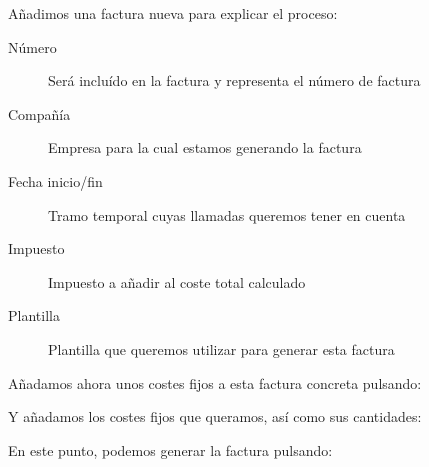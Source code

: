 \documentclass[letterpaper,10pt,spanish]{sphinxmanual}
\begin{document}
Añadimos una factura nueva para explicar el proceso:

\begin{description}
\item[{Número}] \leavevmode{}\label{billing_and_invoices/invoices:term-number}
Será incluído en la factura y representa el número de factura

\item[{Compañía}] \leavevmode{}\label{billing_and_invoices/invoices:term-company}
Empresa para la cual estamos generando la factura

\item[{Fecha inicio/fin}] \leavevmode{}\label{billing_and_invoices/invoices:term-start-end-date}
Tramo temporal cuyas llamadas queremos tener en cuenta

\item[{Impuesto}] \leavevmode{}\label{billing_and_invoices/invoices:term-taxes}
Impuesto a añadir al coste total calculado

\item[{Plantilla}] \leavevmode{}\label{billing_and_invoices/invoices:term-template}
Plantilla que queremos utilizar para generar esta factura

\end{description}

Añadamos ahora unos costes fijos a esta factura concreta pulsando:


Y añadamos los costes fijos que queramos, así como sus cantidades:


En este punto, podemos generar la factura pulsando:

\end{document}
